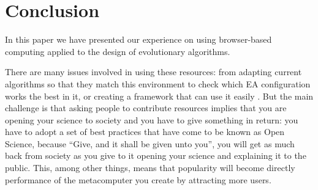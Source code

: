\documentclass{sig-alternate}
\begin{document}
\section{Conclusion}
\label{sec:conc}

In this paper we have presented our experience on using browser-based
computing applied
to the design of evolutionary algorithms.  

There are many issues involved in using these resources: from adapting current algorithms so that they match this environment \cite{agajaj} to check which EA configuration works the best in it, or creating a framework that can use it easily \cite{nodeo2014}. But the main challenge is that asking people to contribute resources implies that you are opening your science to society and you have to give something in return: you have to adopt a set of best practices that have come to be known as Open Science, because ``Give, and it shall be given unto you'', you will get as much back from society as you give to it opening your science and explaining it to the public. This, among other things, means that popularity will become directly performance of the metacomputer you create by attracting more users.




\end{document}
